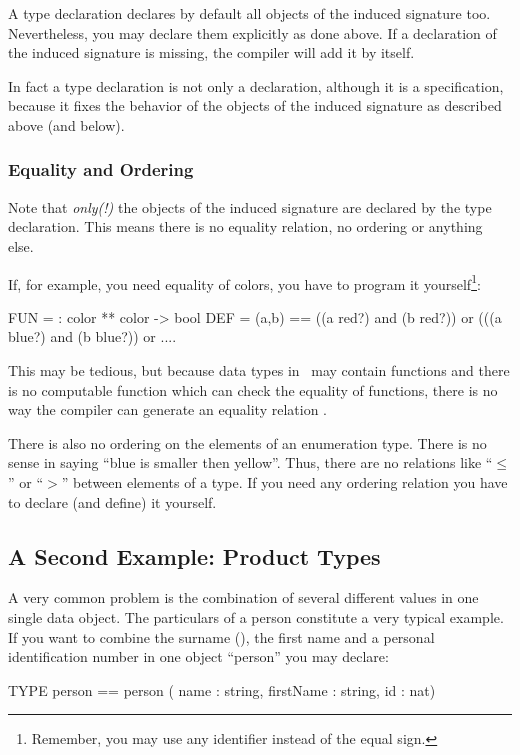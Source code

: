 \medskip
A type declaration declares by default all objects of the induced
signature too. 
Nevertheless, you may declare them explicitly as done above.
If a declaration of the induced signature is missing, the compiler
will add it by itself.

\experienced In fact a type declaration is not only a declaration,
 although   it is a specification, because it fixes the  behavior of the
objects of the induced signature as described above (and below).

 

\subsubsection{Equality and Ordering}
\advanced Note that {\em only(!)\/} the objects of the induced
signature are declared by the  type declaration.
This means there is no equality relation, no ordering or anything
else.

If, for example, you need equality of colors, you have to program it
yourself\footnote{Remember, you may use any identifier instead of the 
  equal sign.}:
\begin{prog}
       FUN = : color ** color -> bool
       DEF = (a,b) == ((a red?) and (b red?))
                      or (((a blue?) and (b blue?))
                      or ....
\end{prog}
This may be tedious, but  because data types in \opal\ may contain functions
 and there is no computable function which can check the equality of
 functions, there is no way the compiler can generate an
equality relation .

There is also no ordering on the elements of an enumeration type. 
There is no sense in saying ``blue is smaller then yellow''.
Thus, there are no relations like ``$\leq$'' or ``$>$'' between
elements of a type.
If you need any ordering relation you have to declare (and define) it
yourself. 


\subsection{A Second Example: Product Types}
\label{sec:productType}

\advanced
A very common problem is the combination of several different values in one
single data object. 
 The particulars of a person constitute a very typical example.
If you want to combine the surname (), the first name and a personal
identification number in one object ``person'' you may declare:
\begin{prog}
        TYPE person == person ( name : string,
                                firstName : string,
                                id : nat)
\end{prog}


